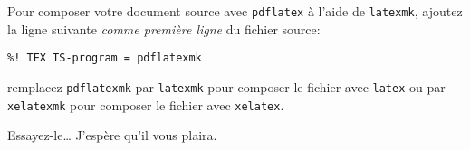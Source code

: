 \documentclass[11pt,french]{article}
\begin{document}
Pour composer votre document source avec \texttt{pdflatex} à l'aide de \texttt{latexmk}, ajoutez la ligne suivante \emph{comme première ligne} du fichier source:
\begin{verbatim}
%! TEX TS-program = pdflatexmk
\end{verbatim}
remplacez  \texttt{pdflatexmk} par \texttt{latexmk} pour composer le fichier avec \texttt{latex} ou par \texttt{xelatexmk} pour composer le fichier avec \texttt{xelatex}.

\vspace{5pt plus 2pt minus 1pt}\noindent
Essayez-le… J'espère qu'il vous plaira.


%
\end{document}
